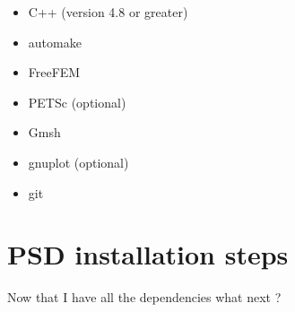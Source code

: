 \documentclass{report}
\begin{document}
\begin{itemize}
\item  {\ttfamily C++}    (version 4.8 or greater)
\item  {\ttfamily automake}
\item  {\ttfamily FreeFEM}
\item  {\ttfamily PETSc}      (optional)
\item  {\ttfamily Gmsh}
\item  {\ttfamily gnuplot}	(optional)
\item  {\ttfamily git}   
\end{itemize}


\section{PSD installation steps \label{sec:psd-install}}
Now that I have all the dependencies what next ?  
\end{document}
